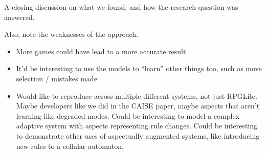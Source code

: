 A closing discussion on what we found, and how the research question was
answered.

Also, note the weaknesses of the approach.

\begin{itemize}
  \item More games could have lead to a more accurate result
  \item It'd be interesting to use the models to ``learn'' other things too,
    such as move selection / mistakes made
  \item Would like to reproduce across multiple different systems, not just
    RPGLite. Maybe developers like we did in the CAISE paper, maybe aspects that
    aren't learning like degraded modes. Could be interesting to model a complex
    adaptive system with aspects representing rule changes. Could be interesting
    to demonstrate other uses of aspectually augmented systems, like introducing
    new rules to a cellular automaton.
\end{itemize}
